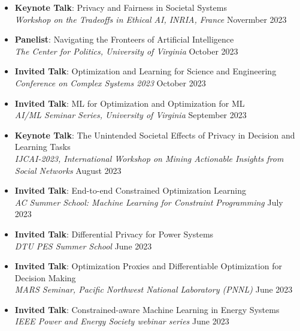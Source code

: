 

\begin{itemize}
  \item {\bf Keynote Talk}: {Privacy and Fairness in Societal Systems}\\
  {\em  Workshop on the Tradeoffs in Ethical AI, INRIA, France}
  \hfill{Novermber 2023}

  \item {\bf Panelist}: {Navigating the Fronteers of Artificial Intelligence}\\
  {\em  The Center for Politics, University of Virginia}
  \hfill{October 2023}

  \item {\bf Invited Talk}: {Optimization and Learning for Science and Engineering}\\
  {\em  Conference on Complex Systems 2023}
  \hfill{October 2023}

  \item {\bf Invited Talk}: {ML for Optimization and Optimization for ML}\\
  {\em  AI/ML Seminar Series, University of Virginia}
  \hfill{September 2023}

  \item {\bf Keynote Talk}: {The Unintended Societal Effects of Privacy in Decision and Learning Tasks}\\
  {\em  IJCAI-2023, International Workshop on Mining Actionable Insights from Social Networks}
  \hfill{August 2023}

  \item {\bf Invited Talk}: {End-to-end Constrained Optimization Learning}\\
  {\em  AC Summer School: Machine Learning for Constraint Programming}
  \hfill{July 2023}

  \item {\bf Invited Talk}: {Differential Privacy for Power Systems}\\
  {\em  DTU PES Summer School}
  \hfill{June 2023}

  \item {\bf Invited Talk}: {Optimization Proxies and Differentiable Optimization for Decision Making}\\
  {\em  MARS Seminar, Pacific Northwest National Laboratory (PNNL)}
  \hfill{June 2023}

  \item {\bf Invited Talk}: {Constrained-aware Machine Learning in Energy Systems}\\
  {\em  IEEE Power and Energy Society webinar series}
  \hfill{June 2023}


\end{itemize}
